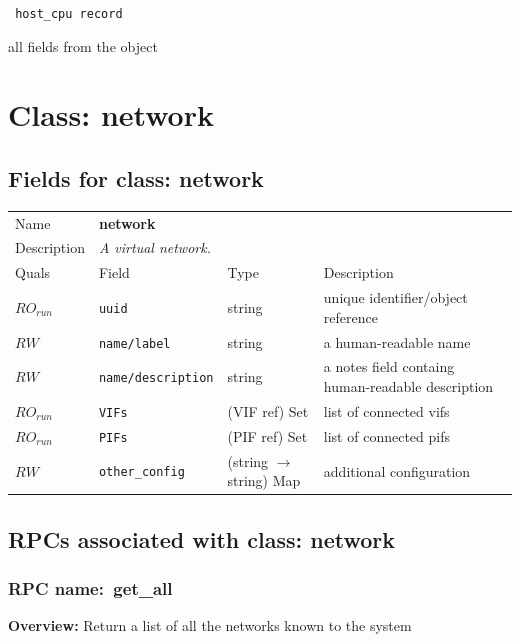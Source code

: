 \vspace{0.3cm}

{\tt 
host\_cpu record
}


all fields from the object
\vspace{0.3cm}
\vspace{0.3cm}
\vspace{0.3cm}

\vspace{1cm}
\newpage
\section{Class: network}
\subsection{Fields for class: network}
\begin{longtable}{|lllp{}|}
\hline
\multicolumn{1}{|l}{Name} & \multicolumn{3}{l|}{\bf network} \\
\multicolumn{1}{|l}{Description} & \multicolumn{3}{l|}{\parbox{11cm}{\em A
virtual network.}} \\
\hline
Quals & Field & Type & Description \\
\hline
$\mathit{RO}_\mathit{run}$ &  {\tt uuid} & string & unique identifier/object reference \\
$\mathit{RW}$ &  {\tt name/label} & string & a human-readable name \\
$\mathit{RW}$ &  {\tt name/description} & string & a notes field containg human-readable description \\
$\mathit{RO}_\mathit{run}$ &  {\tt VIFs} & (VIF ref) Set & list of connected vifs \\
$\mathit{RO}_\mathit{run}$ &  {\tt PIFs} & (PIF ref) Set & list of connected pifs \\
$\mathit{RW}$ &  {\tt other\_config} & (string $\rightarrow$ string) Map & additional configuration \\
\hline
\end{longtable}
\subsection{RPCs associated with class: network}
\subsubsection{RPC name:~get\_all}

{\bf Overview:} 
Return a list of all the networks known to the system

